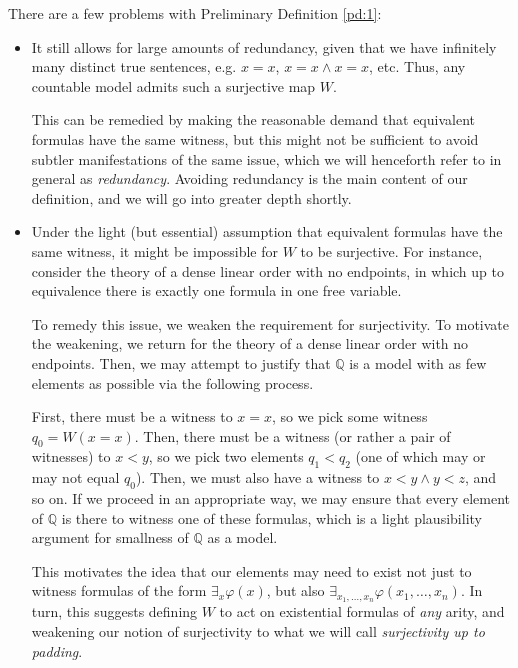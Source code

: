 \documentclass{article}
\theoremstyle{nonumberplain}
\newcommand{\Q}{\mathbb{Q}}
\begin{document}
There are a few problems with Preliminary Definition \ref{pd:1}:
\begin{itemize}
\item It still allows for large amounts of redundancy, given that we have infinitely many distinct true sentences, e.g. $x=x$, $x=x \land x=x$, etc. Thus, any countable model admits such a surjective map $W$.

This can be remedied by making the reasonable demand that equivalent formulas have the same witness, but this might not be sufficient to avoid subtler manifestations of the same issue, which we will henceforth refer to in general as \emph{redundancy}. Avoiding redundancy is the main content of our definition, and we will go into greater depth shortly.

\item Under the light (but essential) assumption that equivalent formulas have the same witness, it might be impossible for $W$ to be surjective. For instance, consider the theory of a dense linear order with no endpoints, in which up to equivalence there is exactly one formula in one free variable.

To remedy this issue, we weaken the requirement for surjectivity. To motivate the weakening, we return for the theory of a dense linear order with no endpoints. Then, we may attempt to justify that $\Q$ is a model with as few elements as possible via the following process.

First, there must be a witness to $x = x$, so we pick some witness $q_0 = W(x=x)$. Then, there must be a witness (or rather a pair of witnesses) to $x<y$, so we pick two elements $q_1 < q_2$ (one of which may or may not equal $q_0$). Then, we must also have a witness to $x<y \land y<z$, and so on. If we proceed in an appropriate way, we may ensure that every element of $\Q$ is there to witness one of these formulas, which is a light plausibility argument for smallness of $\Q$ as a model.

This motivates the idea that our elements may need to exist not just to witness formulas of the form $\exists_x \varphi(x)$, but also $\exists_{x_1, \dots, x_n} \varphi(x_1, \dots, x_n)$. In turn, this suggests defining $W$ to act on existential formulas of \emph{any} arity, and weakening our notion of surjectivity to what we will call \emph{surjectivity up to padding}.
\end{itemize}
\end{document}
